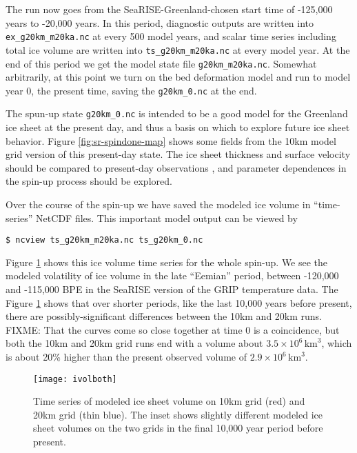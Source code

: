 The run now goes from the SeaRISE-Greenland-chosen start time of -125,000 years to -20,000 years.  In this period, diagnostic outputs are written into \texttt{ex_g20km_m20ka.nc} at every 500 model years, and scalar time series including total ice volume are written into \texttt{ts_g20km_m20ka.nc} at every model year.  At the end of this period we get the model state file \texttt{g20km_m20ka.nc}.  Somewhat arbitrarily, at this point we turn on the bed deformation model and run to model year 0, the present time, saving the \texttt{g20km_0.nc} at the end.

The spun-up state \texttt{g20km_0.nc} is intended to be a good model for the Greenland ice sheet at the present day, and thus a basis on which to explore future ice sheet behavior.  Figure \ref{fig:sr-spindone-map} shows some fields from the 10km model grid version of this present-day state.  The ice sheet thickness and surface velocity should be compared to present-day observations \cite{BKAJS}, and parameter dependences in the spin-up process should be explored.

Over the course of the spin-up we have saved the modeled ice volume in ``time-series'' NetCDF files.  This important model output can be viewed by
\begin{verbatim}
$ ncview ts_g20km_m20ka.nc ts_g20km_0.nc
\end{verbatim}
\noindent Figure \ref{fig:sr-spindone-ivolboth} shows this ice volume time series for the whole spin-up.  We see the modeled volatility of ice volume in the late ``Eemian'' period, between -120,000 and -115,000 BPE in the SeaRISE version of the GRIP temperature data.  The Figure \ref{fig:sr-spindone-ivolboth} shows that over shorter periods, like the last 10,000 years before present, there are possibly-significant differences between the 10km and 20km runs.  FIXME: That the curves come so close together at time 0 is a coincidence, but both the 10km and 20km grid runs end with a volume about $3.5 \times 10^6\,\text{km}^3$, which is about 20\% higher than the present observed volume of $2.9 \times 10^6\,\text{km}^3$.

\begin{figure}[ht]
\centering
\texttt{[image: ivolboth]}
\caption{Time series of modeled ice sheet volume on 10km grid (red) and 20km grid (thin blue).  The inset shows slightly different modeled ice sheet volumes on the two grids in the final 10,000 year period before present.}
\label{fig:sr-spindone-ivolboth}
\end{figure}

